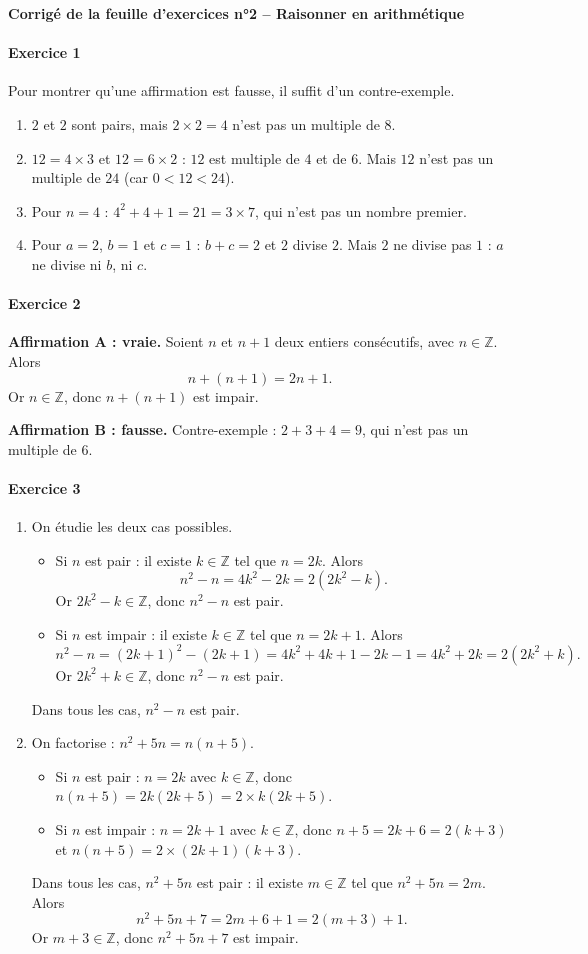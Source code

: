 \documentclass[11pt,a4paper]{article}
\newcommand{\Z}{\mathbb{Z}}
\newcommand{\exo}[1]{\paragraph{Exercice #1}}
\newcommand{\rep}[1]{\textbf{#1}}
\begin{document}
\begin{center}
  {\Large\bfseries Corrigé de la feuille d'exercices n°2 -- Raisonner en arithmétique}
\end{center}

\exo{1}
Pour montrer qu'une affirmation est fausse, il suffit d'un contre-exemple.
\begin{enumerate}[label=\alph*)]
  \item $2$ et $2$ sont pairs, mais $2 \times 2 = 4$ n'est pas un multiple de $8$.
  \item $12 = 4 \times 3$ et $12 = 6 \times 2$ : $12$ est multiple de $4$ et de $6$. Mais $12$ n'est pas un multiple de $24$ (car $0 < 12 < 24$).
  \item Pour $n = 4$ : $4^2 + 4 + 1 = 21 = 3 \times 7$, qui n'est pas un nombre premier.
  \item Pour $a = 2$, $b = 1$ et $c = 1$ : $b + c = 2$ et $2$ divise $2$. Mais $2$ ne divise pas $1$ : $a$ ne divise ni $b$, ni $c$.
\end{enumerate}

\exo{2}
\rep{Affirmation A : vraie.} Soient $n$ et $n+1$ deux entiers consécutifs, avec $n \in \Z$. Alors
\[ n + (n+1) = 2n + 1. \]
Or $n \in \Z$, donc $n + (n+1)$ est impair.

\rep{Affirmation B : fausse.} Contre-exemple : $2 + 3 + 4 = 9$, qui n'est pas un multiple de $6$.

\exo{3}
\begin{enumerate}[label=\rep{\arabic*.}]
  \item On étudie les deux cas possibles.
  \begin{itemize}
    \item Si $n$ est pair : il existe $k \in \Z$ tel que $n = 2k$. Alors
    \[ n^2 - n = 4k^2 - 2k = 2(2k^2 - k). \]
    Or $2k^2 - k \in \Z$, donc $n^2 - n$ est pair.
    \item Si $n$ est impair : il existe $k \in \Z$ tel que $n = 2k + 1$. Alors
    \[ n^2 - n = (2k+1)^2 - (2k+1) = 4k^2 + 4k + 1 - 2k - 1 = 4k^2 + 2k = 2(2k^2 + k). \]
    Or $2k^2 + k \in \Z$, donc $n^2 - n$ est pair.
  \end{itemize}
  Dans tous les cas, $n^2 - n$ est pair.

  \item On factorise : $n^2 + 5n = n(n+5)$.
  \begin{itemize}
    \item Si $n$ est pair : $n = 2k$ avec $k \in \Z$, donc $n(n+5) = 2k(2k+5) = 2 \times k(2k+5)$.
    \item Si $n$ est impair : $n = 2k + 1$ avec $k \in \Z$, donc $n + 5 = 2k + 6 = 2(k+3)$ et
    $n(n+5) = 2 \times (2k+1)(k+3)$.
  \end{itemize}
  Dans tous les cas, $n^2 + 5n$ est pair : il existe $m \in \Z$ tel que $n^2 + 5n = 2m$. Alors
  \[ n^2 + 5n + 7 = 2m + 6 + 1 = 2(m+3) + 1. \]
  Or $m + 3 \in \Z$, donc $n^2 + 5n + 7$ est impair.
\end{enumerate}
\end{document}
